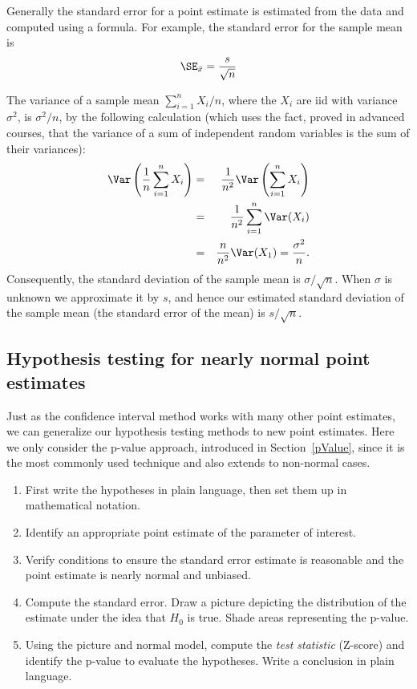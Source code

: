 Generally the standard error for a point estimate is estimated from the data and computed using a formula. For example, the standard error for the sample mean is
\begin{eqnarray*}
\SE_{\bar{x}} = \frac{s}{\sqrt{n}}
\end{eqnarray*}

The variance of a sample mean $\sum_{i=1}^n X_i/n$, where the $X_i$ are iid with variance $\sigma^2$, is $\sigma^2/n$, by the following calculation (which uses the fact, proved in advanced courses, that the variance of a sum of independent random variables is the sum of their variances):
\begin{eqnarray*}
	\Var\left(\frac1n\sum_{i=1}^n X_i\right) &=& \frac1{n^2}\Var\left(\sum_{i=1}^n X_i\right)\\
	 &=& \frac1{n^2}\sum_{i=1}^n\Var(X_i)\\
	 &=& \frac{n}{n^2}\Var(X_1) = \frac{\sigma^2}n.
\end{eqnarray*}
Consequently, the standard deviation of the sample mean is $\sigma/\sqrt{n}$. When $\sigma$ is unknown we approximate it by $s$, and hence our estimated standard deviation of the sample mean (the standard error of the mean) is $s/\sqrt{n}$.



\subsection{Hypothesis testing for nearly normal point estimates}

Just as the confidence interval method works with many other point estimates, we can generalize our hypothesis testing methods to new point estimates. Here we only consider the p-value approach, introduced in Section~\ref{pValue}, since it is the most commonly used technique and also extends to non-normal cases.

\begin{termBox}{
	\begin{enumerate}
		\setlength{\itemsep}{0mm}
		\item First write the hypotheses in plain language, then set them up in mathematical notation.
		\item Identify an appropriate point estimate of the parameter of interest.
		\item Verify conditions to ensure the standard error estimate is reasonable and the point estimate is nearly normal and unbiased.
		\item Compute the standard error. Draw a picture depicting the distribution of the estimate under the idea that $H_0$ is true. Shade areas representing the p-value.
		\item Using the picture and normal model, compute the \emph{test statistic} (Z-score) and identify the p-value to evaluate the hypotheses. Write a conclusion in plain language.
	\end{enumerate}}
\end{termBox}


